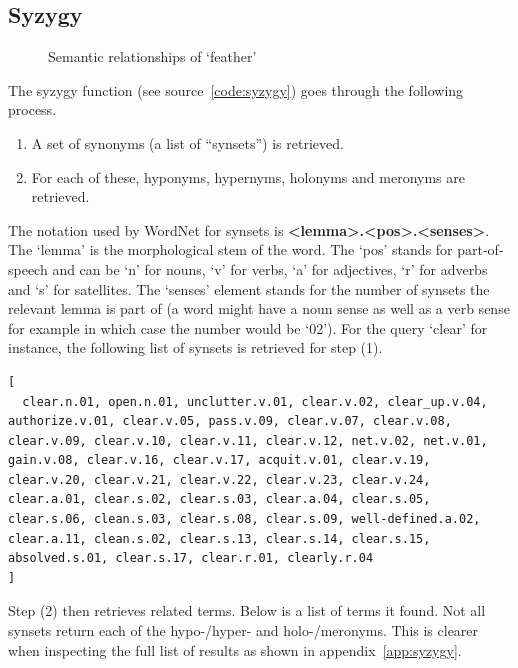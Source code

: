\subsection{Syzygy}
\label{s:analsyzygy}

\begin{figure}[!htbp]
\centering
  
  \caption[Semantic relationships of `feather']{Semantic relationships of `feather'}
\label{fig:wordnet}
\end{figure}

The syzygy function (see source~\ref{code:syzygy}) goes through the following process.

\begin{enumerate}
  \item A set of synonyms (a list of ``synsets'') is retrieved.
  \item For each of these, hyponyms, hypernyms, holonyms and meronyms are retrieved.
\end{enumerate}

The notation used by WordNet for synsets is \textbf{<lemma>.<pos>.<senses>}. The `lemma' is the morphological stem of the word. The `pos' stands for part-of-speech and can be `n' for nouns, `v' for verbs, `a'
for adjectives, `r' for adverbs and `s' for satellites. The `senses' element stands for the number of synsets the relevant lemma is part of (a word might have a noun sense as well as a verb sense for example in which case the number would be `02'). For the query `clear' for instance, the following list of synsets is retrieved for step (1).

\begin{verbatim}
[
  clear.n.01, open.n.01, unclutter.v.01, clear.v.02, clear_up.v.04, authorize.v.01, clear.v.05, pass.v.09, clear.v.07, clear.v.08, clear.v.09, clear.v.10, clear.v.11, clear.v.12, net.v.02, net.v.01, gain.v.08, clear.v.16, clear.v.17, acquit.v.01, clear.v.19, clear.v.20, clear.v.21, clear.v.22, clear.v.23, clear.v.24, clear.a.01, clear.s.02, clear.s.03, clear.a.04, clear.s.05, clear.s.06, clean.s.03, clear.s.08, clear.s.09, well-defined.a.02, clear.a.11, clean.s.02, clear.s.13, clear.s.14, clear.s.15, absolved.s.01, clear.s.17, clear.r.01, clearly.r.04
]
\end{verbatim}

Step (2) then retrieves related terms. Below is a list of terms it found. Not all synsets return each of the hypo-/hyper- and holo-/meronyms. This is clearer when inspecting the full list of results as shown in appendix~\ref{app:syzygy}. 


